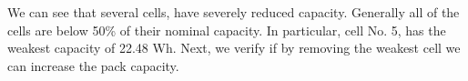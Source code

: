 \documentclass[10pt,twocolumn]{IEEEtran}
\begin{document}
We can see that several cells, have severely reduced capacity. 
Generally all of the cells are below 50\%  of their nominal capacity.
In particular, cell No. 5, has the weakest capacity of 22.48 Wh. 
Next, we verify if by removing the weakest cell we can increase the pack capacity.


%
%
  
\end{document}
